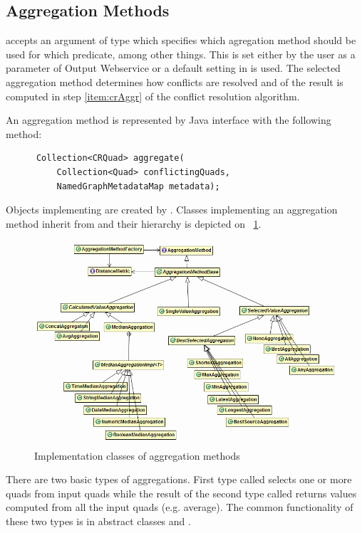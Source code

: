 \subsection{Aggregation Methods}
\CR accepts an argument of type  which specifies which agregation method should be used for which predicate, among other things. This is set either by the user as a parameter of Output Webservice or a default setting in \odcs is used.
The selected aggregation method determines how conflicts are resolved and \aggrq of the result is computed in step \ref{item:crAggr} of the conflict resolution algorithm.

An aggregation method is represented by Java interface  with the following method:

\begin{verbatim}
      Collection<CRQuad> aggregate(
          Collection<Quad> conflictingQuads, 
          NamedGraphMetadataMap metadata);
\end{verbatim}

Objects implementing  are created by . Classes implementing an aggregation method inherit from  and their hierarchy is depicted on \figurename~\ref{fig:crAggregations}.

\begin{figure}[htb]
    \centering
    \includegraphics[width=\textwidth]{images/dia-cr-aggregations.png}
    \caption{Implementation classes of aggregation methods}
	\label{fig:crAggregations}
\end{figure}

There are two basic types of aggregations. First type called  selects one or more quads from input quads while the result of the second type called  returns values computed from all the input quads (e.g. average). The common functionality of these two types is in abstract classes  and .

